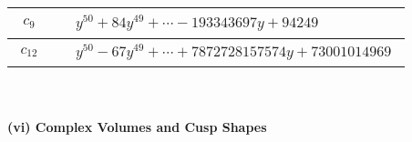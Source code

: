 \documentclass[1p]{elsarticle_modified}
\theoremstyle{definition}
\begin{document}
\begin{tabular}{m{50pt}|m{274pt}}
\hline $$\begin{aligned}c_{9}\end{aligned}$$&$\begin{aligned}
&y^{50}+84 y^{49}+\cdots-193343697 y+94249
\end{aligned}$\\
\hline $$\begin{aligned}c_{12}\end{aligned}$$&$\begin{aligned}
&y^{50}-67 y^{49}+\cdots+7872728157574 y+73001014969
\end{aligned}$\\
\hline
\end{tabular}\\~\\
\newpage\flushleft \textbf{(vi) Complex Volumes and Cusp Shapes}
\end{document}
